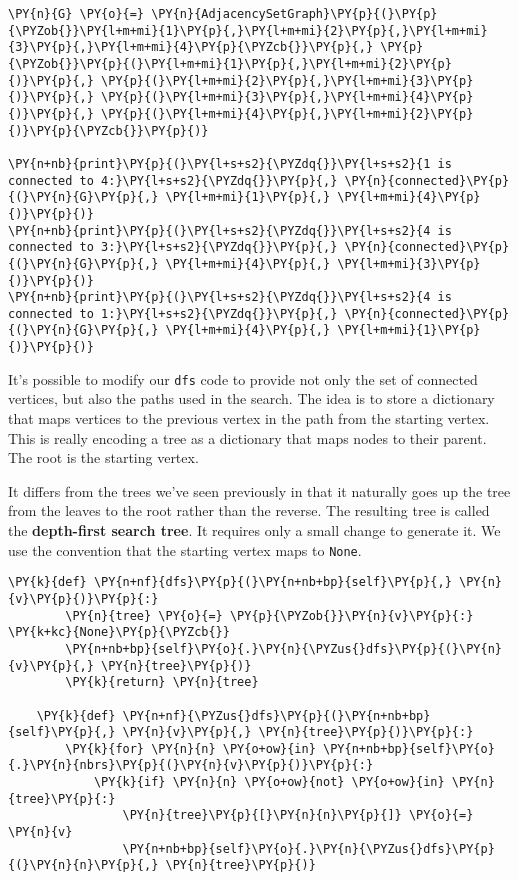 \begin{Verbatim}[commandchars=\\\{\}]
\PY{n}{G} \PY{o}{=} \PY{n}{AdjacencySetGraph}\PY{p}{(}\PY{p}{\PYZob{}}\PY{l+m+mi}{1}\PY{p}{,}\PY{l+m+mi}{2}\PY{p}{,}\PY{l+m+mi}{3}\PY{p}{,}\PY{l+m+mi}{4}\PY{p}{\PYZcb{}}\PY{p}{,} \PY{p}{\PYZob{}}\PY{p}{(}\PY{l+m+mi}{1}\PY{p}{,}\PY{l+m+mi}{2}\PY{p}{)}\PY{p}{,} \PY{p}{(}\PY{l+m+mi}{2}\PY{p}{,}\PY{l+m+mi}{3}\PY{p}{)}\PY{p}{,} \PY{p}{(}\PY{l+m+mi}{3}\PY{p}{,}\PY{l+m+mi}{4}\PY{p}{)}\PY{p}{,} \PY{p}{(}\PY{l+m+mi}{4}\PY{p}{,}\PY{l+m+mi}{2}\PY{p}{)}\PY{p}{\PYZcb{}}\PY{p}{)}

\PY{n+nb}{print}\PY{p}{(}\PY{l+s+s2}{\PYZdq{}}\PY{l+s+s2}{1 is connected to 4:}\PY{l+s+s2}{\PYZdq{}}\PY{p}{,} \PY{n}{connected}\PY{p}{(}\PY{n}{G}\PY{p}{,} \PY{l+m+mi}{1}\PY{p}{,} \PY{l+m+mi}{4}\PY{p}{)}\PY{p}{)}
\PY{n+nb}{print}\PY{p}{(}\PY{l+s+s2}{\PYZdq{}}\PY{l+s+s2}{4 is connected to 3:}\PY{l+s+s2}{\PYZdq{}}\PY{p}{,} \PY{n}{connected}\PY{p}{(}\PY{n}{G}\PY{p}{,} \PY{l+m+mi}{4}\PY{p}{,} \PY{l+m+mi}{3}\PY{p}{)}\PY{p}{)}
\PY{n+nb}{print}\PY{p}{(}\PY{l+s+s2}{\PYZdq{}}\PY{l+s+s2}{4 is connected to 1:}\PY{l+s+s2}{\PYZdq{}}\PY{p}{,} \PY{n}{connected}\PY{p}{(}\PY{n}{G}\PY{p}{,} \PY{l+m+mi}{4}\PY{p}{,} \PY{l+m+mi}{1}\PY{p}{)}\PY{p}{)}
\end{Verbatim}



It's possible to modify our \texttt{dfs} code to provide not only the set of connected vertices, but also the paths used in the search.
The idea is to store a dictionary that maps vertices to the previous vertex in the path from the starting vertex.
This is really encoding a tree as a dictionary that maps nodes to their parent.
The root is the starting vertex.


It differs from the trees we've seen previously in that it naturally goes up the tree from the leaves to the root rather than the reverse.
The resulting tree is called the \textbf{depth-first search tree}.
It requires only a small change to generate it.
We use the convention that the starting vertex maps to \texttt{None}.

\begin{Verbatim}[commandchars=\\\{\}]
    \PY{k}{def} \PY{n+nf}{dfs}\PY{p}{(}\PY{n+nb+bp}{self}\PY{p}{,} \PY{n}{v}\PY{p}{)}\PY{p}{:}
        \PY{n}{tree} \PY{o}{=} \PY{p}{\PYZob{}}\PY{n}{v}\PY{p}{:} \PY{k+kc}{None}\PY{p}{\PYZcb{}}
        \PY{n+nb+bp}{self}\PY{o}{.}\PY{n}{\PYZus{}dfs}\PY{p}{(}\PY{n}{v}\PY{p}{,} \PY{n}{tree}\PY{p}{)}
        \PY{k}{return} \PY{n}{tree}

    \PY{k}{def} \PY{n+nf}{\PYZus{}dfs}\PY{p}{(}\PY{n+nb+bp}{self}\PY{p}{,} \PY{n}{v}\PY{p}{,} \PY{n}{tree}\PY{p}{)}\PY{p}{:}
        \PY{k}{for} \PY{n}{n} \PY{o+ow}{in} \PY{n+nb+bp}{self}\PY{o}{.}\PY{n}{nbrs}\PY{p}{(}\PY{n}{v}\PY{p}{)}\PY{p}{:}
            \PY{k}{if} \PY{n}{n} \PY{o+ow}{not} \PY{o+ow}{in} \PY{n}{tree}\PY{p}{:}
                \PY{n}{tree}\PY{p}{[}\PY{n}{n}\PY{p}{]} \PY{o}{=} \PY{n}{v}
                \PY{n+nb+bp}{self}\PY{o}{.}\PY{n}{\PYZus{}dfs}\PY{p}{(}\PY{n}{n}\PY{p}{,} \PY{n}{tree}\PY{p}{)}
\end{Verbatim}


